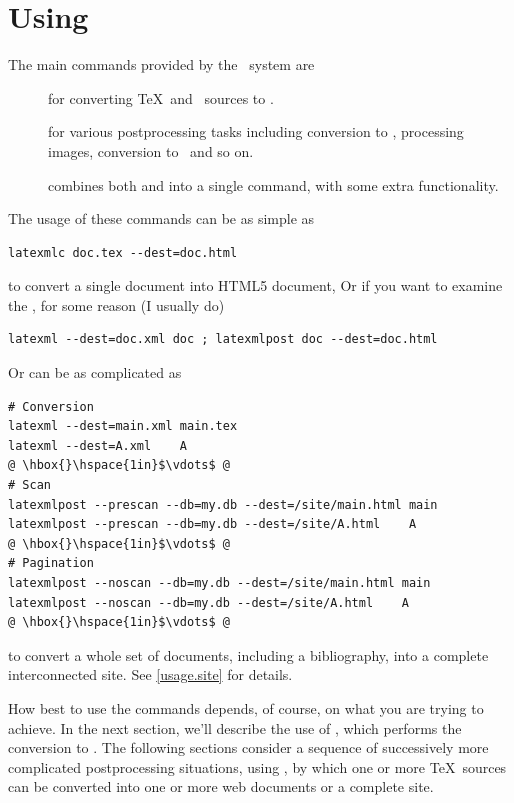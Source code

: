 \documentclass{book}
\begin{document}
\chapter{Using \LaTeXML}\label{usage}
The main commands provided by the \LaTeXML\ system are
\begin{description}
\item[] for converting \TeX\ and \BibTeX\ sources to \XML.
\item[] for various postprocessing tasks including
conversion to \HTML, processing images, conversion to \MathML\ and so on.
\item[] combines both  and 
  into a single command, with some extra functionality.
\end{description}
\noindent The usage of these commands can be as simple as
\begin{lstlisting}[style=shell]
latexmlc doc.tex --dest=doc.html
\end{lstlisting}
\noindent to convert a single document into \textsc{HTML5} document,
Or if you want to examine the \XML, for some reason (I usually do)
\begin{lstlisting}[style=shell]
latexml --dest=doc.xml doc ; latexmlpost doc --dest=doc.html
\end{lstlisting}
Or can be as complicated as
\begin{lstlisting}[style=shell]
# Conversion
latexml --dest=main.xml main.tex
latexml --dest=A.xml    A
@ \hbox{}\hspace{1in}$\vdots$ @
# Scan
latexmlpost --prescan --db=my.db --dest=/site/main.html main
latexmlpost --prescan --db=my.db --dest=/site/A.html    A
@ \hbox{}\hspace{1in}$\vdots$ @
# Pagination
latexmlpost --noscan --db=my.db --dest=/site/main.html main
latexmlpost --noscan --db=my.db --dest=/site/A.html    A
@ \hbox{}\hspace{1in}$\vdots$ @
\end{lstlisting}
\noindent to convert a whole set of documents, including a bibliography,
into a complete interconnected site.  See \ref{usage.site} for details.

How best to use the commands depends, of course, on what you
are trying to achieve.  In the next section, we'll describe
the use of , which performs the conversion to \XML.
The following sections consider a sequence of
successively more complicated postprocessing situations,
using ,
by which one or more \TeX\ sources can be converted into
one or more web documents or a complete site.
\end{document}
